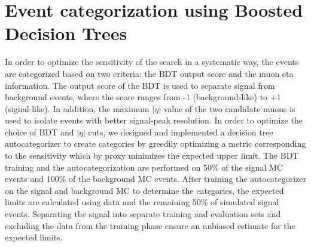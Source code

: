 \clearpage

\section{Event categorization using Boosted Decision Trees}
\label{bdt_cats}

In order to optimize the sensitivity of the \Htomm search in a systematic way, the events
are categorized based on two criteria: the BDT output score and the muon eta information.
The output score of the BDT is used to separate signal
from background events, where the score ranges from -1 (background-like) to +1 (signal-like).
In addition, the maximum $|\eta|$ value of the two candidate muons is used to isolate events with better
signal-peak resolution. In order to optimize the choice of BDT and $|\eta|$ cuts, we designed and implemented
a decision tree autocategorizer to create categories by greedily optimizing a metric corresponding
to the sensitivity which by proxy minimizes the expected upper limit. The BDT training and the autocategorization
are performed on 50\% of the signal MC events and 100\% of the background MC events.
After training the autocategorizer on the signal and background MC to determine the categories,
the expected limits are calculated using data and the remaining 50\% of simulated signal events. Separating the
signal into separate training and evaluation sets and excluding the data from the training phase ensure an unbiased estimate for the expected limits.

